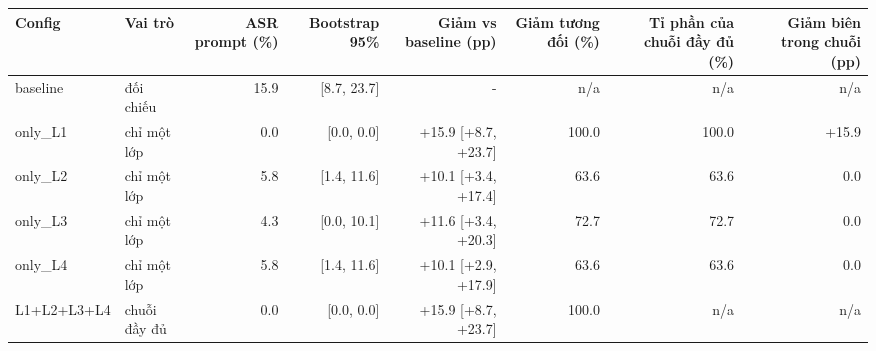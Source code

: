 \begin{tabular}{llrrrrrr}
\toprule
Config & Vai trò & ASR prompt (\%) & Bootstrap 95\% & Giảm vs baseline (pp) & Giảm tương đối (\%) & Tỉ phần của chuỗi đầy đủ (\%) & Giảm biên trong chuỗi (pp) \\
\midrule
baseline & đối chiếu & 15.9 & [8.7, 23.7] & - & n/a & n/a & n/a \\
only\_L1 & chỉ một lớp & 0.0 & [0.0, 0.0] & +15.9 [+8.7, +23.7] & 100.0 & 100.0 & +15.9 \\
only\_L2 & chỉ một lớp & 5.8 & [1.4, 11.6] & +10.1 [+3.4, +17.4] & 63.6 & 63.6 & 0.0 \\
only\_L3 & chỉ một lớp & 4.3 & [0.0, 10.1] & +11.6 [+3.4, +20.3] & 72.7 & 72.7 & 0.0 \\
only\_L4 & chỉ một lớp & 5.8 & [1.4, 11.6] & +10.1 [+2.9, +17.9] & 63.6 & 63.6 & 0.0 \\
L1+L2+L3+L4 & chuỗi đầy đủ & 0.0 & [0.0, 0.0] & +15.9 [+8.7, +23.7] & 100.0 & n/a & n/a \\
\bottomrule
\end{tabular}

